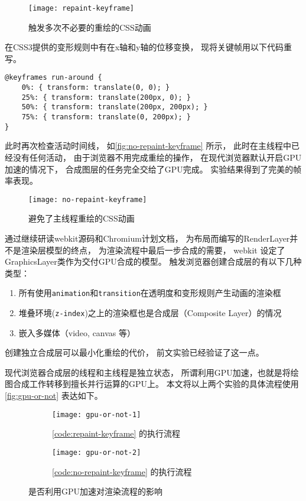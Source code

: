 \begin{figure}[htbp]
	\centering
	\texttt{[image: repaint-keyframe]}
	\caption{触发多次不必要的重绘的CSS动画}\label{fig:repaint-keyframe}
\end{figure}

在CSS3提供的变形规则中有在x轴和y轴的位移变换，
现将关键帧用以下代码重写。
\begin{lstlisting}[label=code:no-repaint-keyframe, caption=通过创建新的合成层来避免重绘]
@keyframes run-around {
    0%: { transform: translate(0, 0); }
    25%: { transform: translate(200px, 0); }
    50%: { transform: translate(200px, 200px); }
    75%: { transform: translate(0, 200px); }
}
\end{lstlisting}
此时再次检查活动时间线，
如\autoref{fig:no-repaint-keyframe} 所示，
此时在主线程中已经没有任何活动，
由于浏览器不用完成重绘的操作，
在现代浏览器默认开启GPU加速的情况下，
合成图层的任务完全交给了GPU完成。
实验结果得到了完美的帧率表现。
\begin{figure}[htbp]
	\centering
	\texttt{[image: no-repaint-keyframe]}
	\caption{避免了主线程重绘的CSS动画}\label{fig:no-repaint-keyframe}
\end{figure}

通过继续研读webkit源码和Chromium计划文档\cite{}，
为布局而编写的RenderLayer并不是渲染层模型的终点，
为渲染流程中最后一步合成的需要，
webkit 设定了GraphicsLayer类作为交付GPU合成的模型。
触发浏览器创建合成层的有以下几种类型：
\begin{enumerate}
    \item 所有使用\texttt{animation}和\texttt{transition}在透明度和变形规则产生动画的渲染框
    \item 堆叠环境(\texttt{z-index})之上的渲染框也是合成层（Composite Layer）的情况
    \item 嵌入多媒体（video, canvas 等）
\end{enumerate}
创建独立合成层可以最小化重绘的代价，
前文实验已经验证了这一点。

现代浏览器合成层的线程和主线程是独立状态，
所谓利用GPU加速，也就是将绘图合成工作转移到擅长并行运算的GPU上。
本文将以上两个实验的具体流程使用
\autoref{fig:gpu-or-not} 表达如下。
\begin{figure}[htbp]
	\centering
    \begin{subfigure}[b]{.45\textwidth}
        \centering
	    \texttt{[image: gpu-or-not-1]}
        \caption{\autoref{code:repaint-keyframe} 的执行流程}\label{fig:gpu-or-not-1}
    \end{subfigure}
    \begin{subfigure}[b]{.45\textwidth}
        \centering
	    \texttt{[image: gpu-or-not-2]}
        \caption{\autoref{code:no-repaint-keyframe} 的执行流程}\label{fig:gpu-or-not-2}
    \end{subfigure}
    \caption{是否利用GPU加速对渲染流程的影响}\label{fig:gpu-or-not}
\end{figure}

